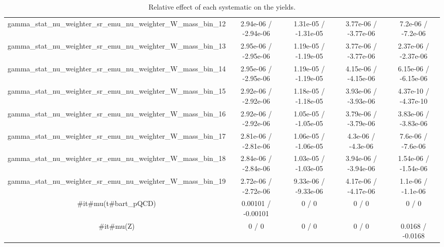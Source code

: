 \documentclass[10pt]{article}
\begin{document}
\begin{table}[htbp]
\begin{center}
\begin{tabular}{|c|c|c|c|c|}
  gamma_stat_nu_weighter_sr_emu_nu_weighter_W_mass_bin_12 & 2.94e-06 / -2.94e-06 & 1.31e-05 / -1.31e-05 & 3.77e-06 / -3.77e-06 & 7.2e-06 / -7.2e-06 \\ 
  gamma_stat_nu_weighter_sr_emu_nu_weighter_W_mass_bin_13 & 2.95e-06 / -2.95e-06 & 1.19e-05 / -1.19e-05 & 3.77e-06 / -3.77e-06 & 2.37e-06 / -2.37e-06 \\ 
  gamma_stat_nu_weighter_sr_emu_nu_weighter_W_mass_bin_14 & 2.95e-06 / -2.95e-06 & 1.19e-05 / -1.19e-05 & 4.15e-06 / -4.15e-06 & 6.15e-06 / -6.15e-06 \\ 
  gamma_stat_nu_weighter_sr_emu_nu_weighter_W_mass_bin_15 & 2.92e-06 / -2.92e-06 & 1.18e-05 / -1.18e-05 & 3.93e-06 / -3.93e-06 & 4.37e-10 / -4.37e-10 \\ 
  gamma_stat_nu_weighter_sr_emu_nu_weighter_W_mass_bin_16 & 2.92e-06 / -2.92e-06 & 1.05e-05 / -1.05e-05 & 3.79e-06 / -3.79e-06 & 3.83e-06 / -3.83e-06 \\ 
  gamma_stat_nu_weighter_sr_emu_nu_weighter_W_mass_bin_17 & 2.81e-06 / -2.81e-06 & 1.06e-05 / -1.06e-05 & 4.3e-06 / -4.3e-06 & 7.6e-06 / -7.6e-06 \\ 
  gamma_stat_nu_weighter_sr_emu_nu_weighter_W_mass_bin_18 & 2.84e-06 / -2.84e-06 & 1.03e-05 / -1.03e-05 & 3.94e-06 / -3.94e-06 & 1.54e-06 / -1.54e-06 \\ 
  gamma_stat_nu_weighter_sr_emu_nu_weighter_W_mass_bin_19 & 2.72e-06 / -2.72e-06 & 9.33e-06 / -9.33e-06 & 4.17e-06 / -4.17e-06 & 1.1e-06 / -1.1e-06 \\ 
  #it{#mu}(t#bar{t}_{pQCD}) & 0.00101 / -0.00101 & 0 / 0 & 0 / 0 & 0 / 0 \\ 
  #it{#mu}(Z) & 0 / 0 & 0 / 0 & 0 / 0 & 0.0168 / -0.0168 \\ 
\hline 
\end{tabular} 
\caption{Relative effect of each systematic on the yields.} 
\end{center} 
\end{table} 
\end{document}
